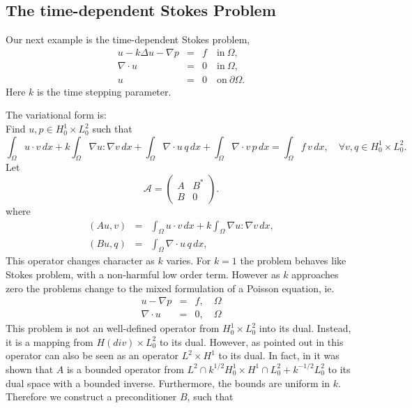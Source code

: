\subsection{The time-dependent Stokes Problem}
Our next example is the time-dependent Stokes problem,
\begin{eqnarray}
u - k \Delta u - \nabla p &=& f \quad \mbox{in} \ \Omega, \\ 
\nabla \cdot u &=& 0 \quad \mbox{in} \  \Omega, \\
             u &=& 0   \quad \mbox{on} \  \partial \Omega.  
\end{eqnarray}
Here $k$ is the time stepping parameter. 

The variational form is: \\ 
Find $u,p \in H^1_0 \times L_0^2$ such that  
\[
\int_\Omega u \cdot v \,  dx + 
k \int_\Omega \nabla u : \nabla v \,  dx + 
\int_\Omega \nabla \cdot u \, q \,  dx +  
\int_\Omega \nabla \cdot v \, p \,  dx = \int_\Omega f\, v\, dx   , \quad \forall v,q \in H^1_0 \times L_0^2.
\]
Let 
\[
\mathcal{A}  =
\begin{pmatrix} A & B^* \\ B & 0 \end{pmatrix}.
\]
where 
\begin{eqnarray}
(A u, v) &=& \int_\Omega u \cdot v \,  dx +  k \int_\Omega \nabla u : \nabla v \,  dx, \\  
(B u, q) &=& \int_\Omega \nabla \cdot u \, q \,  dx,    
\end{eqnarray}
This operator changes character as $k$ varies.  
For $k=1$ the problem behaves like Stokes problem, with 
a non-harmful low order term. However as $k$ approaches
zero the problems change to the mixed formulation of 
a Poisson equation, ie. 
\begin{eqnarray}
u - \nabla p &=& f, \quad \Omega \\
\nabla \cdot u  &=& 0, \quad \Omega
\end{eqnarray}
This problem is not an well-defined operator from 
$H^1_0 \times L_0^2$ into its dual. Instead, it
is a mapping from $H(div) \times L_0^2$  to its dual. 
However, as pointed out in \cite{MardalWinther2004} this operator
can also be seen as an operator $L^2 \times H^1$ to its dual.  
In fact, in \cite{MardalTaiWinther2002a,M-W-04} it was shown that 
 $A$ is a bounded operator from
$L^2 \cap k^{1/2} H^1_0 \times H^1 \cap L_0^2 + k^{-1/2} L_0^2$ to its dual space
with a bounded inverse. Furthermore, the bounds are uniform in $k$. 
Therefore we 
construct a preconditioner $B$, such that  
